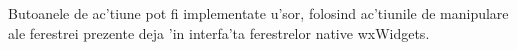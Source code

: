Butoanele de ac'tiune pot fi implementate u'sor, folosind ac'tiunile de manipulare ale ferestrei prezente deja 'in interfa'ta ferestrelor native wxWidgets.



%
%
%
